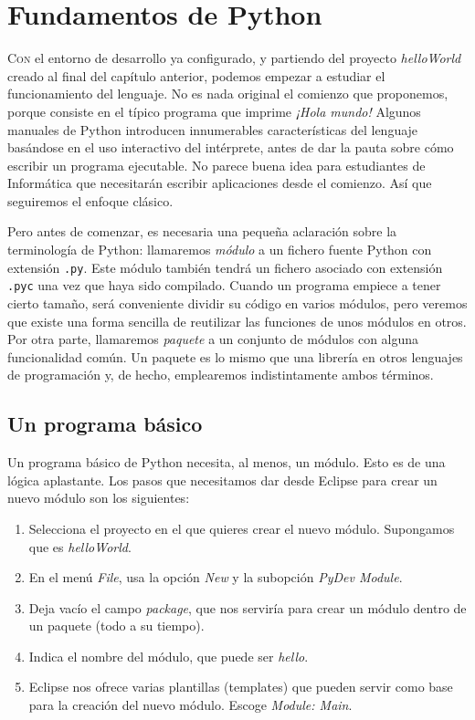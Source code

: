 
\chapter{Fundamentos de Python}

\lettrine[lines=5]{C}{on} el entorno de desarrollo ya configurado, y partiendo del proyecto \emph{helloWorld} creado al final del capítulo anterior, podemos empezar a estudiar el funcionamiento del lenguaje. No es nada original el comienzo que proponemos, porque consiste en el típico programa que imprime \emph{¡Hola mundo!} Algunos manuales de Python introducen innumerables características del lenguaje basándose en el uso interactivo del intérprete, antes de dar la pauta sobre cómo escribir un programa ejecutable. No parece buena idea para estudiantes de Informática que necesitarán escribir aplicaciones desde el comienzo. Así que seguiremos el enfoque clásico.

Pero antes de comenzar, es necesaria una pequeña aclaración sobre la terminología de Python: llamaremos \emph{módulo} a un fichero fuente Python con extensión \texttt{.py}. Este módulo también tendrá un fichero asociado con extensión \texttt{.pyc} una vez que haya sido compilado. Cuando un programa empiece a tener cierto tamaño, será conveniente dividir su código en varios módulos, pero veremos que existe una forma sencilla de reutilizar las funciones de unos módulos en otros. Por otra parte, llamaremos \emph{paquete} a un conjunto de módulos con alguna funcionalidad común. Un paquete es lo mismo que una librería en otros lenguajes de programación y, de hecho, emplearemos indistintamente ambos términos.

\section{Un programa básico}\label{sec:programa_basico}

Un programa básico de Python necesita, al menos, un módulo. Esto es de una lógica aplastante. Los pasos que necesitamos dar desde Eclipse para crear un nuevo módulo son los siguientes:

\begin{enumerate}
	\item Selecciona el proyecto en el que quieres crear el nuevo módulo. Supongamos que es \emph{helloWorld}.
	\item En el menú \emph{File}, usa la opción \emph{New} y la subopción \emph{PyDev Module}.
	\item Deja vacío el campo \emph{package}, que nos serviría para crear un módulo dentro de un paquete (todo a su tiempo).
	\item Indica el nombre del módulo, que puede ser \emph{hello}.
	\item Eclipse nos ofrece varias plantillas (templates) que pueden servir como base para la creación del nuevo módulo. Escoge \emph{Module: Main}.
\end{enumerate}

